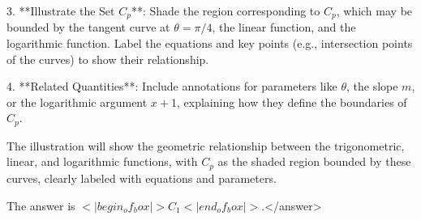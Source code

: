 3. **Illustrate the Set \( C_p \)**:  
   Shade the region corresponding to \( C_p \), which may be bounded by the tangent curve at \( \theta = \pi/4 \), the linear function, and the logarithmic function. Label the equations and key points (e.g., intersection points of the curves) to show their relationship.  

4. **Related Quantities**:  
   Include annotations for parameters like \( \theta \), the slope \( m \), or the logarithmic argument \( x + 1 \), explaining how they define the boundaries of \( C_p \).  

The illustration will show the geometric relationship between the trigonometric, linear, and logarithmic functions, with \( C_p \) as the shaded region bounded by these curves, clearly labeled with equations and parameters.  

The answer is \(<|begin_of_box|>C_1<|end_of_box|>\).</answer>